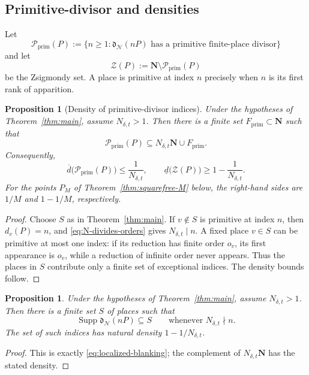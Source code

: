 \documentclass[11pt,letterpaper,reqno]{amsart}
\newtheorem{proposition}[theorem]{Proposition}
\theoremstyle{definition}
\theoremstyle{remark}
\newcommand{\N}{\mathbf N}
\newcommand{\supp}{\operatorname{Supp}}
\newcommand{\dd}{\mathfrak d}
\newcommand{\Ner}{\mathcal N}
\begin{document}
\subsection{Primitive-divisor and densities}

Let
\[
 \mathcal P_{\mathrm{prim}}(P):=
 \{n\ge1:\dd_{\Ner}(nP)\text{ has a primitive finite-place divisor}\}
\]
and let
\[
 \mathcal Z(P):=\N\setminus\mathcal P_{\mathrm{prim}}(P)
\]
be the Zsigmondy set.  A place is primitive at index $n$ precisely when $n$ is
its first rank of apparition.

\begin{proposition}[Density of primitive-divisor indices]
\label{thm:primitive-density}
Under the hypotheses of Theorem~\ref{thm:main}, assume $N_{\delta,t}>1$.  Then
there is a finite set $F_{\mathrm{prim}}\subset\N$ such that
\[
 \mathcal P_{\mathrm{prim}}(P)
 \subseteq N_{\delta,t}\N\cup F_{\mathrm{prim}}.
\]
Consequently,
\[
 \overline d\bigl(\mathcal P_{\mathrm{prim}}(P)\bigr)
 \le\frac1{N_{\delta,t}},
 \qquad
 \underline d\bigl(\mathcal Z(P)\bigr)
 \ge1-\frac1{N_{\delta,t}}.
\]
For the points $P_M$ of Theorem~\ref{thm:squarefree-M} below, the
right-hand sides are $1/M$ and $1-1/M$, respectively.
\end{proposition}

\begin{proof}
Choose $S$ as in Theorem~\ref{thm:main}.  If $v\notin S$ is primitive at index $n$,
then $d_v(P)=n$, and \eqref{eq:N-divides-orders} gives
$N_{\delta,t}\mid n$.  A fixed place $v\in S$ can be primitive at most one
index: if its reduction has finite order $o_v$, its first appearance is
$o_v$, while a reduction of infinite order never appears.  Thus the places in
$S$ contribute only a finite set of exceptional indices.  The density bounds
follow.
\end{proof}

\begin{proposition}
\label{prop:high-density-support}
Under the hypotheses of Theorem~\ref{thm:main}, assume $N_{\delta,t}>1$.  Then
there is a finite set $S$ of places
such that
\[
 \supp\dd_{\Ner}(nP)\subseteq S
 \qquad\text{whenever }N_{\delta,t}\nmid n.
\]
The set of such indices has natural density
$1-1/N_{\delta,t}$.
\end{proposition}

\begin{proof}
This is exactly \eqref{eq:localized-blanking}; the complement of
$N_{\delta,t}\N$ has the stated density.
\end{proof}
\end{document}
